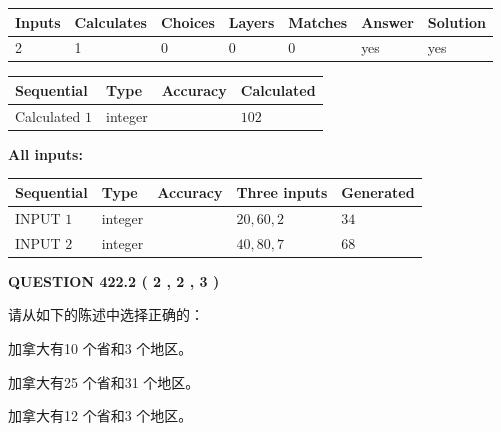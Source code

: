 \documentclass{ctexart}
\begin{document}
   
\noindent\begin{tabular}{|l|l|l|l|l|l|l|}
 \hline
Inputs & Calculates & Choices & Layers & Matches & Answer & Solution \\ \hline
 2  & 
 1  & 
 0
  & 
 0  & 
 0  & 
  yes & 
  yes 
  \\ \hline
 \end{tabular}
   
   
   
   
\noindent{}
   
   
  
  
\noindent\begin{tabular}{|l|l|l|l|}
\hline
 Sequential & Type & Accuracy & Calculated \\ 
\hline
 
 
  Calculated $  1 $ & integer &  & 
  $ 102 $ 
 \\  \hline  
 \end{tabular}
   
   
   
   
\noindent\vspace{0.1in}\hspace{-0.08in} {\textbf{\Large{All inputs: }}}
   
   
  
  
\noindent\begin{tabular}{|l|l|l|l|l|}
\hline
 Sequential & Type & Accuracy & Three inputs & Generated \\ 
\hline
 
 
  INPUT $  1 $ & integer &  & $
 20
 , 
 60
 , 
 2
 $ & $ 34 $ 
 \\  \hline  
 
 
  INPUT $  2 $ & integer &  & $
 40
 , 
 80
 , 
 7
 $ & $ 68 $ 
 \\  \hline  
 \end{tabular}
   
   
  
\vspace{0.2in}
  
{\textbf{\Large{QUESTION
422.2 
 ( 2 , 2 , 3 )
}}}
  
  
请从如下的陈述中选择正确的：
 
 
加拿大有10 个省和3 个地区。
 
 
加拿大有25 个省和31 个地区。
 
 
加拿大有12 个省和3 个地区。
 
\end{document}
